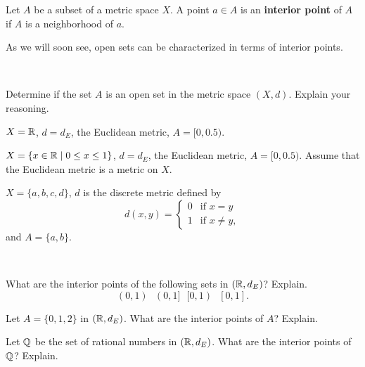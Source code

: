 \begin{definition} Let $A$ be a subset of a metric space $X$. A point $a \in A$ is an \textbf{interior point} of $A$ if $A$ is a neighborhood of $a$.
\end{definition}

As we will soon see, open sets can be characterized in terms of interior points. 

\begin{pa} ~
\be
\item Determine if the set $A$ is an open set in the metric space $(X,d)$. Explain your reasoning.
	\ba
	\item $X = \mathbb{R}$, $d = d_E$, the Euclidean metric, $A = [0,0.5)$.

	\item $X = \{x \in \mathbb{R} \mid 0 \leq x \leq 1\}$, $d = d_E$, the Euclidean metric, $A = [0,0.5)$. Assume that the Euclidean metric is a metric on $X$. 

	\item $X = \{a,b,c,d\}$, $d$ is the discrete metric defined by 
\[d(x,y) = \begin{cases} 0 &\text{if } x = y \\ 1 &\text{if } x \neq y, \end{cases}\]
and $A = \{a,b\}$. 

	\ea

\item ~
	\ba
	\item What are the interior points of the following sets in $(\mathbb{R}, d_E)$? Explain. 
	\[(0,1) \ \ \ (0,1] \ \ \ [0,1) \ \ \ [0,1].\]

	\item Let $A = \{0, 1, 2\}$ in $(\mathbb{R}, d_E)$. What are the interior points of $A$? Explain.
	
	\item Let $\mathbb{Q}$ be the set of rational numbers in $(\mathbb{R}, d_E)$. What are the interior points of $\mathbb{Q}$? Explain.
	
	\ea
\ee

\end{pa}

